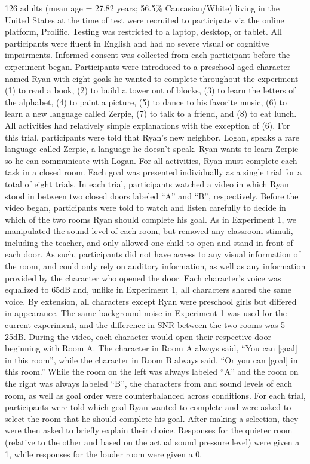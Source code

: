 \documentclass[10pt, letterpaper]{article}
\begin{document}
126 adults (mean age = 27.82 years; 56.5\% Caucasian/White) living in
the United States at the time of test were recruited to participate via
the online platform, Prolific. Testing was restricted to a laptop,
desktop, or tablet. All participants were fluent in English and had no
severe visual or cognitive impairments. Informed consent was collected
from each participant before the experiment began. Participants were
introduced to a preschool-aged character named Ryan with eight goals he
wanted to complete throughout the experiment- (1) to read a book, (2) to
build a tower out of blocks, (3) to learn the letters of the alphabet,
(4) to paint a picture, (5) to dance to his favorite music, (6) to learn
a new language called Zerpie, (7) to talk to a friend, and (8) to eat
lunch. All activities had relatively simple explanations with the
exception of (6). For this trial, participants were told that Ryan's new
neighbor, Logan, speaks a rare language called Zerpie, a language he
doesn't speak. Ryan wants to learn Zerpie so he can communicate with
Logan. For all activities, Ryan must complete each task in a closed
room. Each goal was presented individually as a single trial for a total
of eight trials. In each trial, participants watched a video in which
Ryan stood in between two closed doors labeled ``A'' and ``B'',
respectively. Before the video began, participants were told to watch
and listen carefully to decide in which of the two rooms Ryan should
complete his goal. As in Experiment 1, we manipulated the sound level of
each room, but removed any classroom stimuli, including the teacher, and
only allowed one child to open and stand in front of each door. As such,
participants did not have access to any visual information of the room,
and could only rely on auditory information, as well as any information
provided by the character who opened the door. Each character's voice
was equalized to 65dB and, unlike in Experiment 1, all characters shared
the same voice. By extension, all characters except Ryan were preschool
girls but differed in appearance. The same background noise in
Experiment 1 was used for the current experiment, and the difference in
SNR between the two rooms was 5-25dB. During the video, each character
would open their respective door beginning with Room A. The character in
Room A always said, ``You can {[}goal{]} in this room'', while the
character in Room B always said, ``Or you can {[}goal{]} in this room.''
While the room on the left was always labeled ``A'' and the room on the
right was always labeled ``B'', the characters from and sound levels of
each room, as well as goal order were counterbalanced across conditions.
For each trial, participants were told which goal Ryan wanted to
complete and were asked to select the room that he should complete his
goal. After making a selection, they were then asked to briefly explain
their choice. Responses for the quieter room (relative to the other and
based on the actual sound pressure level) were given a 1, while
responses for the louder room were given a 0.
\end{document}
